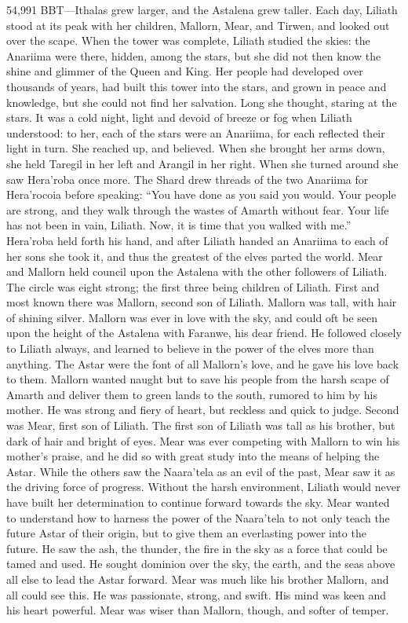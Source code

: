 \documentclass[smalldemyvopaper,11pt,twoside,onecolumn,openright,extrafontsizes]{memoir}
\begin{document}
54,991 BBT—Ithalas grew larger, and the Astalena grew taller. Each day, Liliath stood at its peak with her children, Mallorn, Mear, and Tirwen, and looked out over the scape. When the tower was complete, Liliath studied the skies: the Anariima were there, hidden, among the stars, but she did not then know the shine and glimmer of the Queen and King. Her people had developed over thousands of years, had built this tower into the stars, and grown in peace and knowledge, but she could not find her salvation. Long she thought, staring at the stars. It was a cold night, light and devoid of breeze or fog when Liliath understood: to her, each of the stars were an Anariima, for each reflected their light in turn. She reached up, and believed. When she brought her arms down, she held Taregil in her left and Arangil in her right. When she turned around she saw Hera’roba once more. The Shard drew threads of the two Anariima for Hera’rocoia before speaking: “You have done as you said you would. Your people are strong, and they walk through the wastes of Amarth without fear. Your life has not been in vain, Liliath. Now, it is time that you walked with me.” Hera’roba held forth his hand, and after Liliath handed an Anariima to each of her sons she took it, and thus the greatest of the elves parted the world. Mear and Mallorn held council upon the Astalena with the other followers of Liliath. The circle was eight strong; the first three being children of Liliath.
First and most known there was Mallorn, second son of Liliath. Mallorn was tall, with hair of shining silver. Mallorn was ever in love with the sky, and could oft be seen upon the height of the Astalena with Faranwe, his dear friend. He followed closely to Liliath always, and learned to believe in the power of the elves more than anything. The Astar were the font of all Mallorn’s love, and he gave his love back to them. Mallorn wanted naught but to save his people from the harsh scape of Amarth and deliver them to green lands to the south, rumored to him by his mother. He was strong and fiery of heart, but reckless and quick to judge.
Second was Mear, first son of Liliath. The first son of Liliath was tall as his brother, but dark of hair and bright of eyes. Mear was ever competing with Mallorn to win his mother’s praise, and he did so with great study into the means of helping the Astar. While the others saw the Naara’tela as an evil of the past, Mear saw it as the driving force of progress. Without the harsh environment, Liliath would never have built her determination to continue forward towards the sky. Mear wanted to understand how to harness the power of the Naara’tela to not only teach the future Astar of their origin, but to give them an everlasting power into the future. He saw the ash, the thunder, the fire in the sky as a force that could be tamed and used. He sought dominion over the sky, the earth, and the seas above all else to lead the Astar forward. Mear was much like his brother Mallorn, and all could see this. He was passionate, strong, and swift. His mind was keen and his heart powerful. Mear was wiser than Mallorn, though, and softer of temper.
\end{document}
